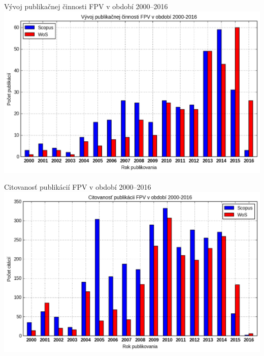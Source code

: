 \documentclass{beamer}
\begin{document}
%
%
\begin{frame}{Vývoj publikačnej činnosti FPV v období 2000--2016}
  \includegraphics[scale=0.5]{plot-all-publications-data.png}
\end{frame}

%
%
\begin{frame}{Citovanosť publikácií FPV v období 2000--2016}
  \includegraphics[scale=0.5]{plot-all-citations-data.png}
\end{frame}
\end{document}

